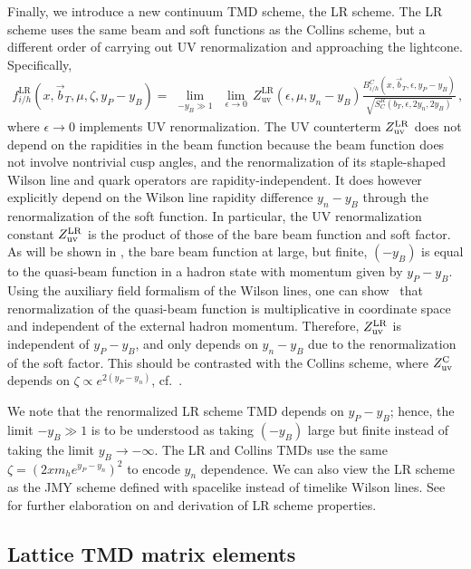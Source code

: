 \documentclass[11pt,a4paper]{article}
\newcommand{\eps}{\epsilon}
\newcommand{\bt}{\vec b_T}
\newcommand{\uv}{\mathrm{uv}}
\newcommand{\LR}{\mathrm{LR}}
\begin{document}
Finally, we introduce a new continuum TMD scheme, the LR scheme.
The LR scheme uses the same beam and soft functions as the Collins scheme,
but a different order of carrying out UV renormalization and approaching the lightcone.
Specifically, 
\begin{align} \label{eq:tmdpdf_LR}
 f^\LR_{i/h}(x, \bt, \mu, \zeta,y_P-y_B)
 = \lim_{\substack{-y_B \gg 1}}\, \lim_{\eps\to0}\, Z_\uv^\LR(\eps, \mu, y_n-y_B)
   \frac{B^C_{i/h}(x, \bt, \eps, y_P - y_B)}{\sqrt{S_C^R(b_T, \eps, 2y_n, 2y_B)}}
\,,\end{align}
where $\eps \to 0$ implements UV renormalization.
The UV counterterm $Z_{\rm uv}^\LR$ does not depend on the rapidities in the beam function because the beam function does not involve nontrivial cusp angles, and the renormalization of its staple-shaped Wilson line and quark operators are rapidity-independent.
It does however explicitly depend on the
Wilson line rapidity difference $y_n-y_B$ through the renormalization of the soft function.
In particular, the UV renormalization constant $Z_{\rm uv}^\LR$ is the product of those of the bare beam function and soft factor.
As will be shown in , the bare beam function at large, but finite, $(-y_B)$ is equal to the quasi-beam function in a hadron state with momentum given by $y_P-y_B$. Using the auxiliary field formalism of the Wilson lines, one can show~\cite{Ji:2017oey,Green:2017xeu,Ebert:2019tvc,Green:2020xco} that renormalization of the quasi-beam function is multiplicative in coordinate space and independent of the external hadron momentum. Therefore, $Z_{\rm uv}^\LR$ is independent of $y_P-y_B$, and only depends on $y_n-y_B$ due to the renormalization of the soft factor.
This should be contrasted with the Collins scheme, where $Z_{\rm uv}^{\rm C}$ depends on
$\zeta \propto e^{2(y_P- y_n)}$, cf.~.

We note that the renormalized LR scheme TMD depends on $y_P - y_B$;
hence, the limit $-y_B \gg 1$ is to be understood as taking $(-y_B)$ large
but finite instead of taking the limit $y_B \to -\infty$.
The LR and Collins TMDs use the same $\zeta = (2 x m_h e^{y_P-y_n})^2$
to encode $y_n$ dependence.
We can also view the LR scheme as the JMY scheme defined with spacelike instead of timelike Wilson lines.
See  for further elaboration on and derivation of LR scheme properties. 

\subsection{Lattice TMD matrix elements}
\label{sec:lattice_tmds}
\end{document}
